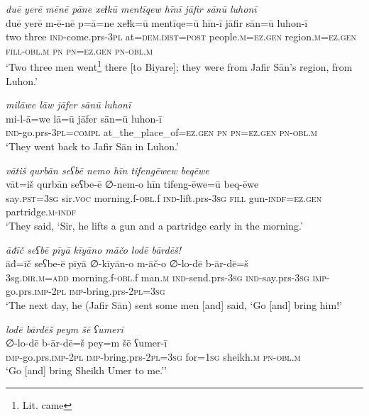 \ea \label{ŠJ.9}
\textit{duē yerē mēnē pāne xeɫkū mentīqew hīnī jāfir sānū luhonī} \\ 
\gll duē yerē m-ē-nē p=ā=ne xeɫk=ū mentīqe=ū hīn-ī jāfir sān=ū luhon-ī \\ 
 two three \textsc{ind-}come.prs\textsc{-3pl} at=\textsc{dem.dist}\textsc{=\textsc{post}} people\textsc{.m}\textsc{=ez.gen} region\textsc{.m}\textsc{=ez.gen} \textsc{fill}\textsc{-obl}\textsc{.m} \textsc{pn} \textsc{pn}\textsc{=ez.gen} \textsc{pn}\textsc{-obl}\textsc{.m} \\ 
\glt `Two three men went\footnote{Lit. came} there [to Biyare]; they were from Jafir Sān’s region, from Luhon.'
\z 
 
\ea \label{ŠJ.13}
\textit{milāwe lāw jāfer sānū luhonī} \\ 
\gll mi-l-ā=we lā=ū jāfer sān=ū luhon-ī \\ 
 \textsc{ind-}go.prs\textsc{-3pl}\textsc{=compl} at\_the\_place\_of\textsc{=ez.gen} \textsc{pn} \textsc{pn}\textsc{=ez.gen} \textsc{pn}\textsc{-obl}\textsc{.m} \\ 
\glt `They went back to Jafir Sān in Luhon.'
\z 
 
\ea \label{ŠJ.17}
\textit{vātiš qurbān seʕbē nemo hīn tifengēwew beqēwe} \\ 
\gll vāt=iš qurbān seʕbe-ē ∅-nem-o hīn tifeng-ēwe=ū beq-ēwe \\ 
 say\textsc{.pst}\textsc{=3sg} sir.\textsc{voc} morning.f\textsc{-obl}.f \textsc{ind-}lift.prs\textsc{-3sg} \textsc{fill} gun\textsc{-indf}\textsc{=ez.gen} partridge\textsc{.m}\textsc{-indf} \\ 
\glt `They said, ‘Sir, he lifts a gun and a partridge early in the morning.'
\z 
 
\ea \label{ŠJ.20}
\textit{āđīč seʕbē pīyā kīyāno māčo lodē bārdēš!} \\ 
\gll āđ=īč seʕbe-ē pīyā ∅-kīyān-o m-āč-o ∅-lo-dē b-ār-dē=š \\ 
 3sg\textsc{.dir}\textsc{.m}\textsc{=add} morning.f\textsc{-obl}.f man\textsc{.m} \textsc{ind-}send.prs\textsc{-3sg} \textsc{ind-}say.prs\textsc{-3sg} \textsc{imp-}go.prs.\textsc{imp-}\textsc{2pl} \textsc{imp-}bring.prs-\textsc{2pl}\textsc{=3sg} \\ 
\glt `The next day, he (Jafir Sān) sent some men [and] said, ‘Go [and] bring him!'
\z 
 
\ea \label{ŠJ.21}
\textit{lodē bārdēš peym šē ʕumerī} \\ 
\gll ∅-lo-dē b-ār-dē=š pey=m šē ʕumer-ī \\ 
 \textsc{imp-}go.prs.\textsc{imp-}\textsc{2pl} \textsc{imp-}bring.prs-\textsc{2pl}\textsc{=3sg} for\textsc{=\textsc{1sg}} sheikh\textsc{.m} \textsc{pn}\textsc{-obl}\textsc{.m} \\ 
\glt `Go [and] bring Sheikh Umer to me.’'
\z 
 
